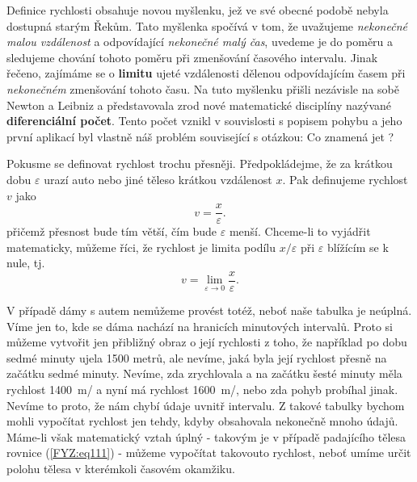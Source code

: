 {    Definice rychlosti obsahuje novou myšlenku, jež ve své obe\-cné podobě nebyla dostupná starým 
    Řekům. Tato myšlenka spočívá v tom, že uvažujeme \emph{nekonečné malou vzdálenost} a 
    odpovídající \emph{nekonečné malý čas}, uvedeme je do poměru a sledujeme chování tohoto poměru 
    při zmenšování časového intervalu. Jinak řečeno, zajímáme se o \textbf{limitu} ujeté 
    vzdálenosti dělenou odpovídajícím časem při \emph{nekonečném} zmenšování tohoto času. Na tuto 
    myšlenku přišli nezávisle na sobě Newton a Leibniz a představovala zrod nové matematické 
    disciplíny nazývané \textbf{diferenciální počet}. Tento počet vznikl v souvislosti s popisem 
    pohybu a jeho první aplikací byl vlastně náš problém související s otázkou: Co znamená jet 
    ?

    Pokusme se definovat rychlost trochu přesněji. Předpokládejme, že za krátkou dobu 
    \(\varepsilon\) urazí auto nebo jiné těleso krátkou vzdálenost \(x\). Pak definujeme rychlost 
    \(v\) jako
    \begin{equation}\label{FYZ:eq113}
      v = \frac{x}{\varepsilon}.
    \end{equation}
    přičemž přesnost bude tím větší, čím bude \(\varepsilon\) menší. Chceme-li to vyjádřit 
    matematicky, můžeme říci, že rychlost je limita podílu \(x/\varepsilon\) při \(\varepsilon\) 
    blížícím se k nule, tj.
    \begin{equation}\label{FYZ:eq114}
      v = \lim_{\varepsilon\to 0}{\frac{x}{\varepsilon}}.
    \end{equation}
    
    V případě dámy s autem nemůžeme provést totéž, neboť naše tabulka je neúplná. Víme jen to, kde 
    se dáma nachází na hranicích minutových intervalů. Proto si můžeme vytvořit jen přibližný obraz 
    o její rychlosti z toho, že například po dobu sedmé minuty ujela \num{1500} metrů, ale nevíme, 
    jaká byla její rychlost přesně na začátku sedmé minuty. Nevíme, zda zrychlovala a na začátku 
    šesté minuty měla rychlost \SI{1400}{\m/\min} a nyní má rychlost \SI{1600}{\m/\min}, nebo zda 
    pohyb probíhal jinak. Nevíme to proto, že nám chybí údaje uvnitř intervalu. Z takové tabulky 
    bychom mohli vypočítat rychlost jen tehdy, kdyby obsahovala nekonečně mnoho údajů. Máme-li však 
    matematický vztah úplný - takovým je v případě padajícího tělesa rovnice (\ref{FYZ:eq111}) - 
    můžeme vypočítat takovouto rychlost, neboť umíme určit polohu tělesa v kterémkoli časovém 
    okamžiku.
    
}
